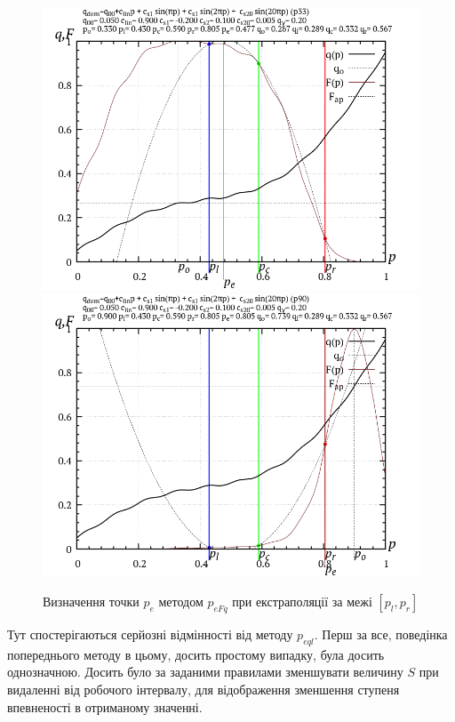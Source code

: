 \begin{figure}[htb!]
  \begin{center}
    \includegraphics[width=49\TW]{p/p_eFq/q_p_eFq_p33.png}
    \hfill
    \includegraphics[width=49\TW]{p/p_eFq/q_p_eFq_p90.png}
  \end{center}
\caption{Визначення точки $ p_e $ методом $ p_{eFq} $ при екстраполяції за межі $ [p_l, p_r] $}
\label{atu:f:p_eFq_extra}
\end{figure}

Тут спостерігаються серйозні відмінності від методу
$ p_{eql} $. Перш за все, поведінка попереднього методу в цьому,
досить простому випадку, була досить однозначною. Досить було
за заданими правилами зменшувати величину
$S$ при видаленні від робочого інтервалу, для відображення
зменшення ступеня впевненості в отриманому значенні.

